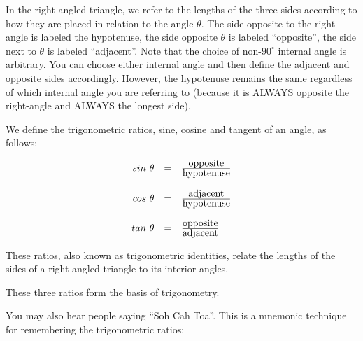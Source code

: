 

In the right-angled triangle, we refer to the lengths of the three sides according to how they are placed in relation to the angle $\theta $. The side opposite to the right-angle is labeled the hypotenuse, the side opposite $\theta $ is labeled ``opposite'', the side next to $\theta $ is labeled ``adjacent''. Note that the choice of non-$90^{\circ}$ internal angle is arbitrary. You can choose either internal angle and then define the adjacent and opposite sides accordingly. However, the hypotenuse remains the same regardless of which internal angle you are referring to (because it is ALWAYS opposite the right-angle and ALWAYS the longest side).\par 

We define the trigonometric ratios, sine, cosine and tangent of an angle, as follows:
\par 

\begin{equation*}
\begin{array}{ccc}\hfill sin~\theta & =& \frac{\mbox{opposite}}{\mbox{hypotenuse}}\hfill \\
\\
 \hfill cos~\theta & =& \frac{\mbox{adjacent}}{\mbox{hypotenuse}}\hfill \\
\\
 \hfill tan~\theta & =& \frac{\mbox{opposite}}{\mbox{adjacent}}\hfill 
\end{array}
\end{equation*}

These ratios, also known as trigonometric identities, relate the lengths of the sides of a right-angled triangle to its interior angles.\par 

These three ratios form the basis of trigonometry. \par

You may also hear people saying ``Soh Cah Toa''. This is a mnemonic technique for remembering the trigonometric ratios:\par 

